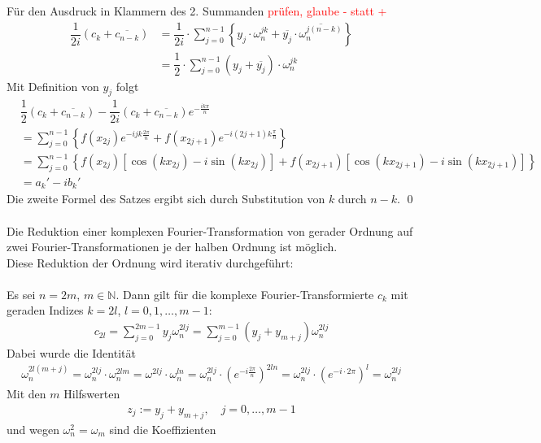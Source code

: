 Für den Ausdruck in Klammern des 2. Summanden \textcolor{red}{prüfen, glaube - statt +}
\begin{align*}
  \dfrac{1}{2i}\left(c_k+\overline{c_{n-k}}\right) 
  &= \dfrac{1}{2i}\cdot\sum_{j=0}^{n-1}\left\{y_j\cdot\omega_n^{jk} + \overline{y_j}\cdot\overline{\omega_n^{j(n-k)}}\right\} \\
  &= \dfrac{1}{2}\cdot\sum_{j=0}^{n-1}\left(y_j+\overline{y_j}\right)\cdot\omega_n^{jk}
\end{align*}
Mit Definition von $y_j$ folgt
\begin{align*}
  &\dfrac{1}{2}\left(c_k+\overline{c_{n-k}}\right) - \dfrac{1}{2i}\left(c_k+\overline{c_{n-k}}\right)e^{-\tfrac{ik\pi}{n}}\\
  &= \sum_{j=0}^{n-1}\left\{f(x_{2j})e^{-ijk\tfrac{2\pi}{n}}+f(x_{2j+1})e^{-i(2j+1)k\tfrac{\pi}{n}}\right\} \\
  &= \sum_{j=0}^{n-1}\left\{f(x_{2j})\left[\cos(kx_{2j})-i\sin(kx_{2j})\right]
  + f(x_{2j+1})\left[\cos(kx_{2j+1})-i\sin(kx_{2j+1})\right]\right\} \\
  &= a_k' - ib_k'
\end{align*}
Die zweite Formel des Satzes ergibt sich durch Substitution von $k$ durch $n-k$. 
\qed\\ \\
Die Reduktion einer komplexen Fourier-Transformation von gerader Ordnung auf zwei Fourier-Transformationen je der halben
Ordnung ist möglich. \\
Diese Reduktion der Ordnung wird iterativ durchgeführt: \\ \\
Es sei $n=2m$, $m\in\mathbb{N}$. Dann gilt für die komplexe Fourier-Transformierte $c_k$ mit geraden Indizes 
$k=2l$, $l=0,1,\dots,m-1$:
\begin{align*}
  c_{2l} = \sum_{j=0}^{2m-1}y_j\omega_n^{2lj} = \sum_{j=0}^{m-1} (y_j+y_{m+j})\omega_n^{2lj}
\end{align*}
Dabei wurde die Identität 
\begin{align*}
  \omega_n^{2l(m+j)} 
  = \omega_n^{2lj}\cdot \omega_n^{2lm} 
  = \omega^{2lj}\cdot \omega_n^{ln} = \omega_n^{2lj}\cdot \left(e^{-i\tfrac{2\pi}{n}}\right)^{2ln} 
  = \omega_n^{2lj}\cdot \left(e^{-i\cdot2\pi}\right)^l 
  = \omega_n^{2lj}
\end{align*}
Mit den $m$ Hilfswerten 
\begin{align*}
  z_j := y_j + y_{m+j}, \quad j=0,\dots,m-1
\end{align*}
und wegen $\omega_n^2 = \omega_m$ sind die Koeffizienten 
